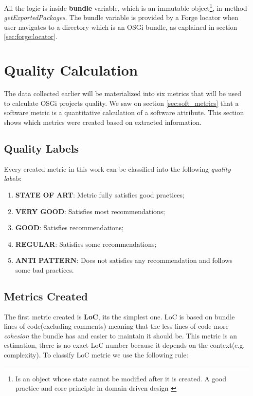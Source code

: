 All the logic is inside \textbf{bundle} variable, which is an immutable object\footnote{Is an object whose state cannot be modified after it is created. A good practice and core principle in domain driven design \citep{Evans 2003}}, in method \emph{getExportedPackages}. The bundle variable is provided by a Forge locator when user navigates to a directory which is an OSGi bundle, as explained in section \ref{sec:forge:locator}. 

\section{Quality Calculation}
The data collected earlier will be materialized into six metrics that will be used to calculate OSGi projects quality. We saw on section \ref{sec:soft_metrics} that a software metric is a quantitative calculation of a software attribute. This section shows which metrics were created based on extracted information.


\subsection{Quality Labels}
Every created metric in this work can be classified into the following \emph{quality labels}:

\begin{enumerate}
\item \textbf{STATE OF ART}: Metric fully satisfies good practices;
\item \textbf{VERY GOOD}: Satisfies most recommendations;
\item \textbf{GOOD}: Satisfies recommendations;
\item \textbf{REGULAR}: Satisfies some recommendations;
\item \textbf{ANTI PATTERN}: Does not satisfies any recommendation and follows some bad practices.
\end{enumerate}


\subsection{Metrics Created}

The first metric created is \textbf{LoC}, its the simplest one. LoC is based on bundle lines of code(excluding comments) meaning that the less lines of code more \emph{cohesion} the bundle has and easier to maintain it should be. This metric is an estimation, there is no exact LoC number because it depends on the context(e.g. complexity). To classify LoC metric we use the following rule:\newline


